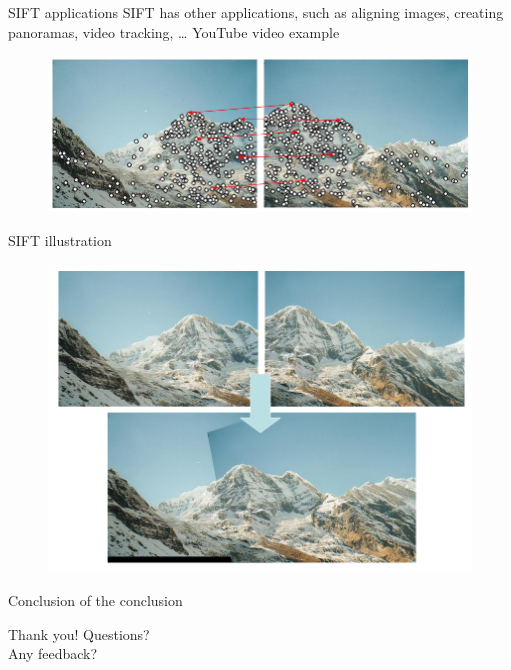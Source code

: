 \documentclass{beamer}
\newcommand{\1}[1]{\mathbbm{1}\left[#1\right]}
\begin{document}
\begin{frame}{SIFT applications}
SIFT has other applications, such as aligning images, creating panoramas, video tracking, \ldots
\pause
\vfill
YouTube video example
\pause
\vfill
\begin{figure}
\centering
\includegraphics[width=\textwidth]{images/sift_panorama_matching.png}
\end{figure}
\end{frame}

\begin{frame}{SIFT illustration}

\begin{figure}
\centering
\includegraphics[width=\textwidth]{images/sift_panorama_result.png}
\end{figure}
\end{frame}

\begin{frame}{Conclusion of the conclusion}

\end{frame}

\begin{frame}
\begin{center}
\huge{Thank you! Questions? \\ Any feedback?}
\end{center}
\end{frame}
\end{document}
